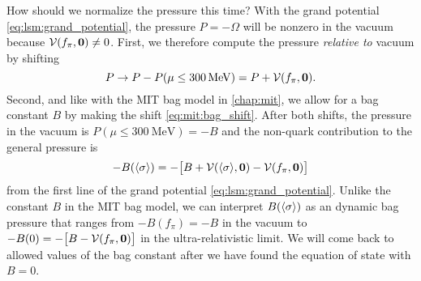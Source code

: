How should we normalize the pressure this time?
With the grand potential \eqref{eq:lsm:grand_potential},
the pressure $P = - \Omega$ will be nonzero in the vacuum because $\mathcal{V}(f_\pi,{\bm{0}}) \neq 0$.
First, we therefore compute the pressure \emph{relative to} vacuum by shifting
\begin{equation}
	P \rightarrow P - P(\mu \leq \SI{300}{\mega\electronvolt}) = P + \mathcal{V}(f_\pi,{\bm{0}}) .
\label{eq:lsm:pressure_bagless}
\end{equation}
Second, and like with the MIT bag model in \cref{chap:mit},
we allow for a bag constant $B$ by making the shift \eqref{eq:mit:bag_shift}.
After both shifts,
the pressure in the vacuum is $P(\mu \leq \SI{300}{\mega\electronvolt}) = -B$
and the non-quark contribution to the general pressure is
\begin{equation}
	-B(\langle \sigma \rangle) = -\big[B+\mathcal{V}(\langle \sigma \rangle,{\bm{0}})-\mathcal{V}(f_\pi,{\bm{0}})\big]
\label{eq:lsm:bag_pressure}
\end{equation}
from the first line of the grand potential \eqref{eq:lsm:grand_potential}.
Unlike the constant $B$ in the MIT bag model,
we can interpret $B(\langle \sigma \rangle)$ as an dynamic bag pressure that ranges from $-B(f_\pi)=-B$ in the vacuum to $-B(0) = -\big[B-\mathcal{V}(f_\pi,{\bm{0}})\big]$ in the ultra-relativistic limit.
We will come back to allowed values of the bag constant after we have found the equation of state with $B=0$.

